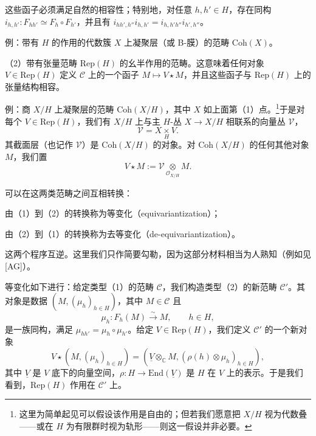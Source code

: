 这些函子必须满足自然的相容性；特别地，对任意 $h,h'\in H$，存在同构 $i_{h,h'} : F_{hh'}\simeq F_h\circ F_{h'}$，并且有 $i_{hh',h''}i_{h,h'} = i_{h,h'h''}i_{h',h''}$。


例：带有 $H$ 的作用的代数簇 $X$ 上凝聚层（或 B-膜）的范畴 $\mathrm{Coh}(X)$。

（2）带有张量范畴 $\mathrm{Rep}(H)$ 的幺半作用的范畴。这意味着任何对象 $V\in\mathrm{Rep}(H)$ 定义 $\mathcal{C}$ 上的一个函子 $M\mapsto V\star M$，并且这些函子与 $\mathrm{Rep}(H)$ 上的张量结构相容。

例：商 $X/H$ 上凝聚层的范畴 $\mathrm{Coh}(X/H)$，其中 $X$ 如上面第（1）点。\footnote{这里为简单起见可以假设该作用是自由的；但若我们愿意把 $X/H$ 视为代数叠——或在 $H$ 为有限群时视为轨形——则这一假设并非必要。}于是对每个 $V\in\mathrm{Rep}(H)$，我们有 $X/H$ 上与主 $H$-丛 $X\to X/H$ 相联系的向量丛 $\mathcal{V}$，
\[
\mathcal{V} = X\underset{H}{\times} V.
\]
其截面层（也记作 $\mathcal{V}$）是 $\mathrm{Coh}(X/H)$ 的对象。对 $\mathrm{Coh}(X/H)$ 的任何其他对象 $M$，我们置
\[
V\star M := \mathcal{V}\underset{\mathcal{O}_{X/H}}{\otimes} M.
\]

可以在这两类范畴之间互相转换：

由（1）到（2）的转换称为等变化（equivariantization）；

由（2）到（1）的转换称为去等变化（de-equivariantization）。

这两个程序互逆。这里我们只作简要勾勒，因为这部分材料相当为人熟知（例如见 [AG]）。


等变化如下进行：给定类型（1）的范畴 $\mathcal{C}$，我们构造类型（2）的新范畴 $\mathcal{C}'$。其对象是数据 $(M,(\mu_h)_{h\in H})$，其中 $M\in\mathcal{C}$ 且
\[
\mu_h : F_h(M)\xrightarrow{\sim} M,\qquad h\in H,
\]
是一族同构，满足 $\mu_{hh'} = \mu_h\circ\mu_{h'}$。给定 $V\in\mathrm{Rep}(H)$，我们定义 $\mathcal{C}'$ 的一个新对象
\[
V\star(M,(\mu_h)_{h\in H}) = (\underline{V}\otimes_{\mathbb{C}} M,(\rho(h)\otimes\mu_h)_{h\in H}),
\]
其中 $\underline{V}$ 是 $V$ 底下的向量空间，$\rho : H\to\mathrm{End}(\underline{V})$ 是 $H$ 在 $V$ 上的表示。于是我们看到，$\mathrm{Rep}(H)$ 作用在 $\mathcal{C}'$ 上。

